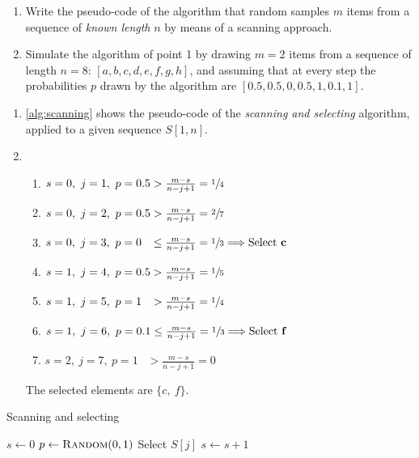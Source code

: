 \exercise

\begin{enumerate}
  \item Write the pseudo-code of the algorithm that random samples $m$ items
  from a sequence of \emph{known length} $n$ by means of a scanning approach.
  \item Simulate the algorithm of point 1 by drawing $m = 2$ items from a
  sequence of length $n = 8$: $[a, b, c, d, e, f, g, h]$, and assuming that at
  every step the probabilities $p$ drawn by the algorithm are $[0.5, 0.5, 0,
  0.5, 1, 0.1, 1]$.
\end{enumerate}

\solution

\begin{enumerate}

  \item \autoref{alg:scanning} shows the pseudo-code of the \emph{scanning
  and selecting} algorithm, applied to a given sequence $S[1, n]$.

  \item \begin{enumerate}[\bf a.]
    \item $s = 0,\ j = 1,\ p = 0.5 > \frac{m-s}{n-j+1} = \sfrac{1}{4}$
    \item $s = 0,\ j = 2,\ p = 0.5 > \frac{m-s}{n-j+1} = \sfrac{2}{7}$
    \item $s = 0,\ j = 3,\ p = 0\phantom{.5} \le \frac{m-s}{n-j+1} = \sfrac{1}{3} \Longrightarrow \text{Select \bf c}$
    \item $s = 1,\ j = 4,\ p = 0.5 > \frac{m-s}{n-j+1} = \sfrac{1}{5}$
    \item $s = 1,\ j = 5,\ p = 1\phantom{.5} > \frac{m-s}{n-j+1} = \sfrac{1}{4}$
    \item $s = 1,\ j = 6,\ p = 0.1 \le \frac{m-s}{n-j+1} = \sfrac{1}{3} \Longrightarrow \text{Select \bf f}$
    \item $s = 2,\ j = 7,\ p = 1\phantom{.5} > \frac{m-s}{n-j+1} = 0$
  \end{enumerate}
  The selected elements are $\{ c,\ f \}$.

\end{enumerate}
%
\begin{algorithm}[h]
\caption{Scanning and selecting}\label{alg:scanning}
\begin{algorithmic}[1]
\State $s \gets 0$
  \State $p \gets \text{\sc Random}(0, 1)$
  \State Select $S[j]$
  \State $s \gets s + 1$
  \EndIf
\EndFor
\end{algorithmic}
\end{algorithm}
